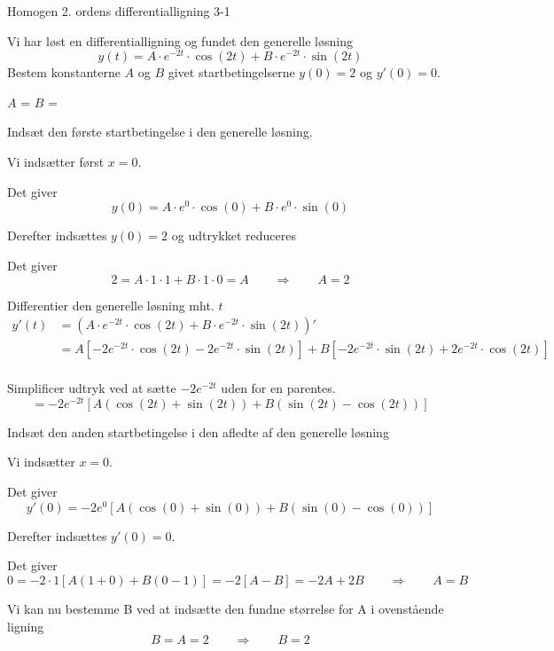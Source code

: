 \documentclass{article}
\begin{document}
\begin{exercise}{Homogen 2. ordens differentialligning 3-1}
	
	Vi har løst en differentialligning og fundet den generelle løsning
	\[
	y(t) = A \cdot e^{-2 t}  \cdot \cos(2 t)+ B \cdot e^{-2 t}  \cdot \sin(2 t)
	\]
	Bestem konstanterne $A$ og $B$ givet startbetingelserne $y(0)=2$ og $y'(0)=0$.
	
	
	$A$ = 		
$B$ = 
	
	\hint
	
	Indsæt den første startbetingelse i den generelle løsning. 
	
	
	\hint
	
	Vi indsætter først $x=0$.
	
	\hint
	
	Det giver
	\[
	y(0)=  A \cdot e^{0}  \cdot \cos(0)+ B \cdot e^{0}  \cdot \sin(0)
	\]
	
	\hint
	
	Derefter indsættes $y(0)=2$ og udtrykket reduceres
	
	\hint 
	
	Det giver 
	\[
	2= A \cdot 1  \cdot 1+ B \cdot 1  \cdot 0  = A \qquad \Rightarrow \qquad A = 2
	\]
	
	\hint 
	
	Differentier den generelle løsning mht. $t$
	\begin{align*}
	y'(t) &= \left(A \cdot e^{-2 t}  \cdot \cos(2 t)+ B \cdot e^{-2 t}  \cdot \sin(2 t)\right)' \\
			&= A \left[-2 e^{-2t} \cdot \cos(2t) - 2e^{-2t} \cdot \sin(2t) \right] + B \left[ -2 e^{-2t} \cdot \sin(2t) + 2e^{-2t} \cdot \cos(2t) \right] \\
	\end{align*}
	
	\hint
	
	Simplificer udtryk ved at sætte $-2 e^{-2t}$ uden for en parentes.
	\[
	= - 2 e^{-2t} \left[ A (\cos(2t)+\sin(2t)) + B (\sin(2t) -\cos(2t))   \right]
	\]
	
	\hint 
	
	Indsæt den anden startbetingelse i den afledte af den generelle løsning
	
	\hint
	
	Vi indsætter $x=0$.
	
	\hint 
	
	Det giver
	\[
	y'(0) = - 2 e^{0} \left[ A (\cos(0)+\sin(0)) + B (\sin(0) -\cos(0))   \right]
	\]
	
	\hint 
	
	Derefter indsættes $y'(0)=0$.	
	\hint
	
	Det giver
	\[
	0 = - 2 \cdot 1 \left[ A (1+0) + B (0 -1)   \right] = - 2\left[ A -B    \right] = -2 A + 2B \qquad \Rightarrow \qquad A = B
	\]
	
	\hint 
	
	Vi kan nu bestemme B ved at indsætte den fundne størrelse for A i ovenstående ligning
	\[
	B = A = 2 \qquad \Rightarrow \qquad B = 2
	\]

	
\end{exercise}
\end{document}
